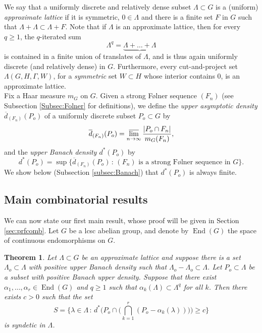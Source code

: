 \documentclass[12pt,reqno,a4paper]{amsart}
\numberwithin{equation}{section}
\newcommand{\ra}{\rightarrow}
\DeclareMathOperator{\End}{End}
\theoremstyle{theorem}
\newtheorem{theorem}{Theorem}[section]
\theoremstyle{task}
\theoremstyle{definition}
\begin{document}
We say that a uniformly discrete and relatively dense subset $\Lambda \subset G$ is a (uniform) \emph{approximate lattice} if it is symmetric, $0 \in \Lambda$ and there is a finite set $F$ in $G$ such that $\Lambda + \Lambda \subset \Lambda + F$. Note that if $\Lambda$ is an approximate lattice, then for every $q \geq 1$, the $q$-iterated sum 
\[
\Lambda^q = \underbrace{\Lambda + \ldots + \Lambda}
\]
is contained in a finite union of translates of $\Lambda$, and is thus again 
uniformly discrete (and relatively dense) in $G$. Furthermore, every cut-and-project set $\Lambda(G,H,\Gamma,W)$, for a \emph{symmetric} set $W \subset H$ whose interior contains $0$, is an approximate lattice. \\

Fix a Haar measure $m_G$ on $G$. Given a strong F\o lner sequence $(F_n)$ (see Subsection \ref{Subsec:Folner} for definitions), we define the \emph{upper asymptotic density $\overline{d}_{(F_n)}(P_o)$} of a uniformly discrete subset $P_o \subset G$ 
by
\[
\overline{d}_{(F_n)}(P_o) = \varlimsup_{n \ra \infty} \frac{|P_o \cap F_n|}{m_G(F_n)},
\]
and the \emph{upper Banach density $d^*(P_o)$} by
\[
d^*(P_o) = \sup\big\{ \overline{d}_{(F_n)}(P_o) \, : \, \textrm{$(F_n)$ is a strong F\o lner sequence in $G$}\}.
\]
We show below (Subsection \ref{subsec:Banach}) that $d^*(P_o)$ is always finite. 

\subsection{Main combinatorial results}

We can now state our first main result, whose proof will be given in Section \ref{sec:prfcomb}. Let $G$ be a lcsc abelian group, and 
denote by $\End(G)$ the space of continuous endomorphisms on $G$.

\begin{theorem}
\label{Thm_MainComb}
Let $\Lambda \subset G$ be an approximate lattice and suppose there is a set $\Lambda_o \subset \Lambda$ with positive upper Banach density such that $\Lambda_o - \Lambda_o \subset \Lambda$. 
Let $P_o \subset \Lambda$ be a subset with positive Banach upper density. Suppose that there exist $\alpha_1,\ldots,\alpha_r \in \End(G)$ and $q \geq 1$ such that $\alpha_k(\Lambda) \subset \Lambda^q$ for all $k$. Then there exists $c > 0$ such that the set
\[
S = \Big\{ \lambda \in \Lambda \, : \, d^*\Big(P_o \cap \Big( \bigcap_{k=1}^r (P_o - \alpha_k(\lambda)) \Big)\Big) \geq c \Big\}
\]
is syndetic in $\Lambda$. 
\end{theorem}
\end{document}
